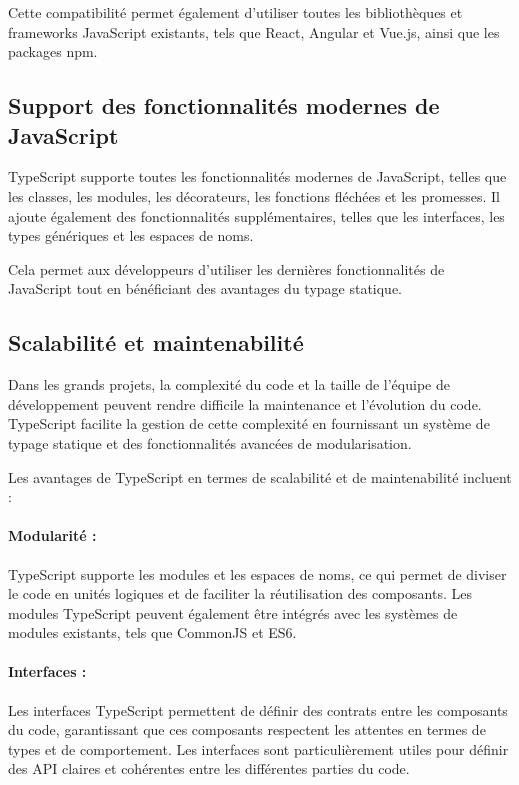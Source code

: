 Cette compatibilité permet également d'utiliser toutes les bibliothèques et frameworks JavaScript existants, tels que React, Angular et Vue.js, ainsi que les packages npm.

\subsection{Support des fonctionnalités modernes de JavaScript}

TypeScript supporte toutes les fonctionnalités modernes de JavaScript, telles que les classes, les modules, les décorateurs, les fonctions fléchées et les promesses. Il ajoute également des fonctionnalités supplémentaires, telles que les interfaces, les types génériques et les espaces de noms.

Cela permet aux développeurs d'utiliser les dernières fonctionnalités de JavaScript tout en bénéficiant des avantages du typage statique.

\subsection{Scalabilité et maintenabilité}

Dans les grands projets, la complexité du code et la taille de l'équipe de développement peuvent rendre difficile la maintenance et l'évolution du code. TypeScript facilite la gestion de cette complexité en fournissant un système de typage statique et des fonctionnalités avancées de modularisation.

Les avantages de TypeScript en termes de scalabilité et de maintenabilité incluent :

\paragraph{Modularité :} TypeScript supporte les modules et les espaces de noms, ce qui permet de diviser le code en unités logiques et de faciliter la réutilisation des composants. Les modules TypeScript peuvent également être intégrés avec les systèmes de modules existants, tels que CommonJS et ES6.
\paragraph{Interfaces :} Les interfaces TypeScript permettent de définir des contrats entre les composants du code, garantissant que ces composants respectent les attentes en termes de types et de comportement. Les interfaces sont particulièrement utiles pour définir des API claires et cohérentes entre les différentes parties du code.
